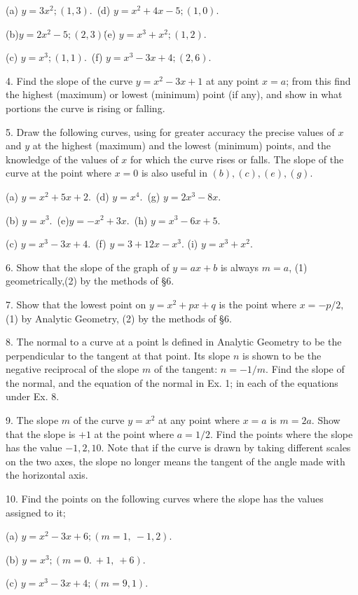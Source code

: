 \documentclass[12pt]{article}
\begin{document}
(a) $y=3x^{2};(1,3)$.\ (d) $y=x^{2}+4x-5;(1,0)$.

(b)$y=2x^{2}-5;(2,3)$\. (e) $y=x^3+x^{2};(1,2)$.

(c) $y=x^{3};(1,1)$.\ (f) $y=x^{3}-3x+4;(2,6)$.

4. Find the slope of the curve $y=x^{2}-3x+1$ at any point $x=a$;
from this find the highest (maximum) or lowest (minimum) point (if
any), and show in what portions the curve is rising or falling.

5. Draw the following curves, using for greater accuracy the precise
values of $x$ and $y$ at the highest (maximum) and the lowest (minimum)
points, and the knowledge of the values of $x$ for which the curve rises or
falls. The slope of the curve at the point where $x=0$ is also useful in
$(b), (c), (e), (g)$.

(a) $y=x^{2}+5x+2$.\ (d) $y=x^{4}$.\ (g) $y=2x^3-8x$.

(b) $y=x^3$.\ (e)$y=-x^{2}+3x$.\ (h) $y=x^3-6x+5$.

(c) $y=x^3-3x+4$.\ (f) $y=3+12x-x^{3}$. (i) $y=x^{3}+x^{2}$.

6. Show that the slope of the graph of $y=ax+b$ is always $m=a$,
(1) geometrically,(2) by the methods of \S 6.

7. Show that the lowest point on $y=x^{2}+px+q$ is the point where
$x=-p/2,$ (1) by Analytic Geometry, (2) by the methods of \S 6.

8. The normal to a curve at a point ls defined in Analytic Geometry
to be the perpendicular to the tangent at that point. Its slope $n$ is shown
to be the negative reciprocal of the slope $m$ of the tangent: $n=-1/m$.
Find the slope of the normal, and the equation of the normal in Ex. 1;
in each of the equations under Ex. 8.

9. The slope $m$ of the curve $y=x^{2}$ at any point where $x=a$ is
$m=2a$. Show that the slope is $+1$ at the point where $a=1/2$. Find the
points where the slope has the value $-1,2,10$. Note that if the curve
is drawn by taking different scales on the two axes, the slope no longer
means the tangent of the angle made with the horizontal axis.

10. Find the points on the following curves where the slope has the
values assigned to it;
\begin{center}
(a) $y=x^{2}-3x+6;(m=1,\ -1,2)$.
\end{center}
\begin{center}
(b) $y=x^3;(m=0.\ +1,\ +6)$.
\end{center}
\begin{center}
(c) $y=x^3-3x+4;(m=9,1)$.
\end{center}
\end{document}
